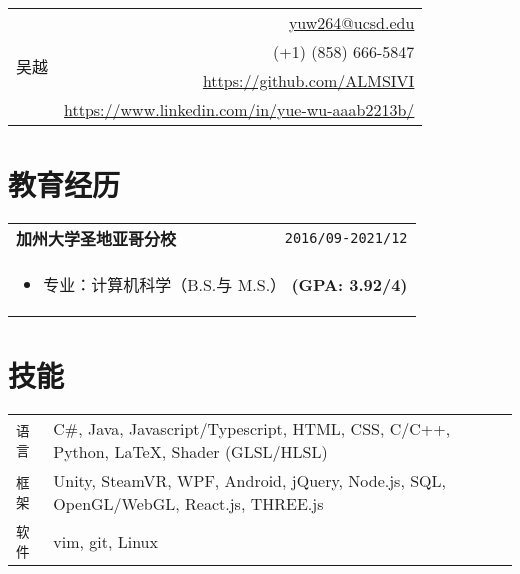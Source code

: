 \documentclass[UTF8]{ctexart}
\newcommand{\itemcols}[1]{
\multicolumn{2}{p{\dimexpr \linewidth-2\tabcolsep}}{
\begin{itemize}
#1
\end{itemize}
}
}
\begin{document}
\noindent
\begin{tabularx}{\linewidth}{X r}
\multirow{4}{*}{{\fontsize{50}{60}\selectfont 吴越}}
& \href{mailto:yuw264@ucsd.edu}{yuw264@ucsd.edu} \\
& (+1) (858) 666-5847 \\
& \href{https://github.com/ALMSIVI}{https://github.com/ALMSIVI} \\
& \href{https://www.linkedin.com/in/yue-wu-aaab2213b/}{https://www.linkedin.com/in/yue-wu-aaab2213b/}
\end{tabularx}
\section{教育经历}
\smallskip
\noindent
\begin{tabularx}{\linewidth}{X r}
\textbf{\large 加州大学圣地亚哥分校} & \texttt{2016/09-2021/12} \\
\itemcols{
\item 专业：计算机科学（B.S.与 M.S.） \textbf{(GPA: 3.92/4)}
}
\end{tabularx}
\section{技能}
\smallskip
\noindent
\begin{tabularx}{\linewidth}{l X}
\texttt{语言} & C\#, Java, Javascript/Typescript, HTML, CSS, C/C++, Python, \LaTeX, Shader (GLSL/HLSL) \\
\texttt{框架} & Unity, SteamVR, WPF, Android, jQuery, Node.js, SQL, OpenGL/WebGL, React.js, THREE.js \\
\texttt{软件} & vim, git, Linux
\end{tabularx}
\end{document}
